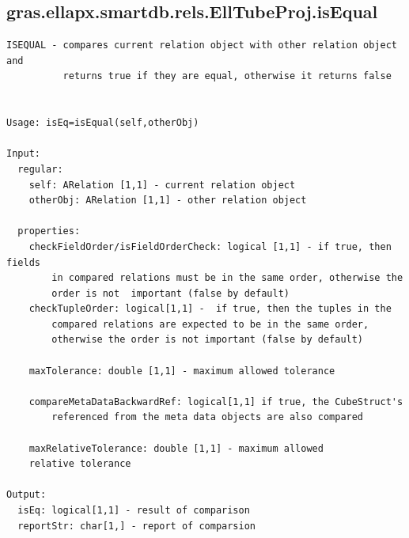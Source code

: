 \documentclass[letterpaper,10pt,english]{sphinxmanual}
\begin{document}
\subsection{gras.ellapx.smartdb.rels.EllTubeProj.isEqual}
\label{chap_functions:gras-ellapx-smartdb-rels-elltubeproj-isequal}
\begin{Verbatim}[commandchars=\\\{\}]
ISEQUAL - compares current relation object with other relation object and
          returns true if they are equal, otherwise it returns false


Usage: isEq=isEqual(self,otherObj)

Input:
  regular:
    self: ARelation [1,1] - current relation object
    otherObj: ARelation [1,1] - other relation object

  properties:
    checkFieldOrder/isFieldOrderCheck: logical [1,1] - if true, then fields
        in compared relations must be in the same order, otherwise the
        order is not  important (false by default)
    checkTupleOrder: logical[1,1] -  if true, then the tuples in the
        compared relations are expected to be in the same order,
        otherwise the order is not important (false by default)

    maxTolerance: double [1,1] - maximum allowed tolerance

    compareMetaDataBackwardRef: logical[1,1] if true, the CubeStruct's
        referenced from the meta data objects are also compared

    maxRelativeTolerance: double [1,1] - maximum allowed
    relative tolerance

Output:
  isEq: logical[1,1] - result of comparison
  reportStr: char[1,] - report of comparsion
\end{Verbatim}
\end{document}
